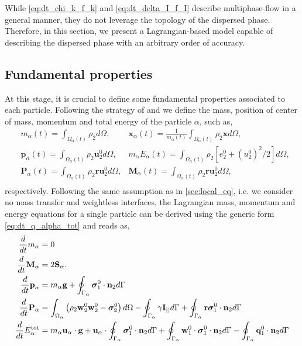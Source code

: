 
While \ref{eq:dt_chi_k_f_k} and \ref{eq:dt_delta_I_f_I} describe multiphase-flow in a general manner, they do not leverage the topology of the dispersed phase. 
Therefore, in this section, we present a Lagrangian-based model capable of describing the dispersed phase with an arbitrary order of accuracy.

\subsection{Fundamental properties}

At this stage, it is crucial to define some fundamental properties associated to each particle.
Following the strategy of \citet{lhuillier2009rheology,lhuillier1992volume,zaepffel2011modelisation} and \citet[Chapter 2]{morel2015mathematical}
we define the mass, position of center of mass, momentum and total energy of the particle $\alpha$, such as,
\begin{align}
    &m_\alpha(t)
    = \int_{\Omega_\alpha(t)} \rho_2  d\Omega,
    &\textbf{x}_\alpha(t)
    = \frac{1}{m_\alpha(t) }\int_{\Omega_\alpha(t)} \rho_2 \textbf{x} d\Omega,\\
    &\textbf{p}_\alpha(t) 
    = \int_{\Omega_\alpha(t)} \rho_2 \textbf{u}_2^0 d\Omega,
    & m_\alpha E_\alpha(t) 
    = \int_{\Omega_\alpha(t)} \rho_2 [e_2^0 + (u_2^0)^2/2] d\Omega,\\
    &\textbf{P}_\alpha(t) 
    = \int_{\Omega_\alpha(t)} \rho_2 \textbf{r}\textbf{u}_2^0 d\Omega,
    &\textbf{M}_\alpha(t) 
    = \int_{\Omega_\alpha(t)} \rho_2 \textbf{r}\textbf{u}_2^0 d\Omega,\\
    \label{eq:position_and_momentum_def}
\end{align}
respectively. 
Following the same assumption as in \ref{sec:local_eq}, i.e. we consider no mass transfer and weightless interfaces, the Lagrangian  mass, momentum and energy equations for a single particle can be derived using the generic form \ref{eq:dt_q_alpha_tot} and reads as, 
\begin{align}
    \label{eq:dt_m_alpha}
    \frac{d}{dt} m_\alpha
    &= 
    0\\
    \frac{d}{dt} {\textbf{M}_\alpha}
    &=2\textbf{S}_\alpha. 
    \label{eq:dt_M_alpha}
    \\
    \label{eq:dt_p_alpha}
    \frac{d}{dt} \textbf{p}_\alpha
    &= 
    m_\alpha\textbf{g}
    +  \oint_{\Gamma_\alpha} \bm{\sigma}_1^0 \cdot \textbf{n}_2 d\Gamma\\
    \frac{d}{dt} {\textbf{P}_\alpha}
    &= \int_{\Omega_\alpha}  \left(
        \rho_2  \textbf{w}_2^0 \textbf{w}_2^0 
        - \bm{\sigma}_2^0
    \right)  d\Omega
    - \oint_{\Gamma_\alpha}  
        \gamma \textbf{I}_{||}
     d\Gamma
    + \oint_{\Gamma_\alpha}  \textbf{r}\bm{\sigma}_1^0\cdot \textbf{n}_2 d\Gamma 
    \label{eq:dt_P_alpha}\\
    \label{eq:dt_E_alpha}
    \frac{d}{dt} E_\alpha^\text{tot}
    &= 
    m_\alpha \textbf{u}_\alpha \cdot \textbf{g}
    +\textbf{u}_\alpha \cdot \oint_{\Gamma_\alpha} \bm{\sigma}_1^0 \cdot \textbf{n}_2 d\Gamma
    +\oint_{\Gamma_\alpha} \textbf{w}_1^0 \cdot \bm{\sigma}_1^0 \cdot  \textbf{n}_2 d\Gamma 
    - \oint_{\Gamma_\alpha} \textbf{q}_1^0 \cdot \textbf{n}_2 d\Gamma \\
\end{align}
